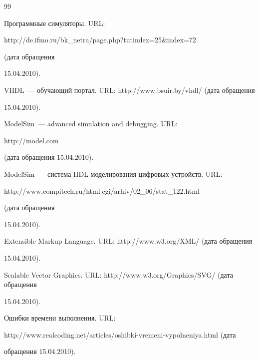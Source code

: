 {\begin{thebibliography}{99}


Программные симуляторы. URL: {\sf 


http://de.ifmo.ru/bk\_netra/page.\linebreak php?tutindex=25\&index=72} (дата обращения


15.04.2010).







VHDL~--- обучающий портал. URL: {\sf http://www.bsuir.by/vhdl/} (дата обращения


15.04.2010).







ModelSim~--- advanced simulation and debugging. URL: {\sf 


http://\linebreak model.com} (дата обращения 15.04.2010).









ModelSim~--- система HDL-моделирования цифровых устройств. URL: {\sf 


http://www.compitech.ru/html.cgi/arhiv/02\_06/\linebreak stat\_122.html} (дата обращения 


15.04.2010).







Extensible Markup Language. URL: {\sf http://www.w3.org/XML/} (дата обращения 


15.04.2010).







Scalable Vector Graphics. URL: {\sf http://www.w3.org/Graphics/SVG/} (дата обращения 


15.04.2010).







Ошибки времени выполнения. URL: 


{\sf http://www.realcoding.net/\linebreak articles/oshibki-vremeni-vypolneniya.html} (дата 


обращения 15.04.2010).


\end{thebibliography}


}


